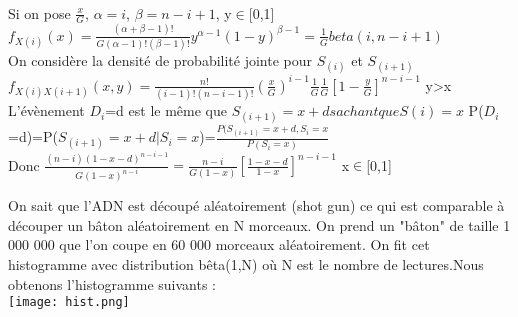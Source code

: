 \documentclass{book}
\begin{document}
\\Si on pose $ \frac{x}{G}$, $\alpha=i$, $\beta=n-i+1$, y$\in$[0,1]                                                                                                                                                                                                                                                                                                                                                                                                                                                                                                                                                                                                                                                    \\ 
$f_{X(i)}(x)= \frac{(\alpha+\beta-1)!}{G(\alpha-1)!(\beta-1)!}y^{\alpha-1}(1-y)^{\beta-1}=\frac{1}{G}beta(i,n-i+1) $\\
On considère la densité de probabilité jointe pour $S_(i)$ et $S_{(i+1)}$\\
$f_{X(i)X(i+1)}(x,y) = \frac{n!}{(i-1)!(n-i-1)!} (\frac{x}{G})^{i-1} \frac{1}{G} \frac{1}{G}[1-\frac{y}{G}]^{n-i-1}$ y>x\\
L'évènement $D_i$=d est le même que $S_{(i+1)}=x+d sachant que S(i)=x$
P($D_i$=d)=P($S_{(i+1)}=x+d|S_i=x $)=$\frac{P(S_{(i+1)}=x+d,S_i=x}{P(S_i=x)} $\\
Donc $\frac{(n-i)(1-x-d)^{n-i-1}}{G(1-x)^{n-i}}=\frac{n-i}{G(1-x)}[\frac{1-x-d}{1-x}]^{n-i-1}$ x$\in$[0,1]                                                                                                                                                                                                                                                                                                                                                                                                                                                                                                                                                                                                                                                   

On sait que l'ADN est découpé aléatoirement (shot gun) ce qui est comparable à découper un bâton aléatoirement en N morceaux. 
On prend un "bâton" de taille 1 000 000 que l'on coupe en 60 000 morceaux aléatoirement. 
On fit cet histogramme avec distribution bêta(1,N) où N est le nombre de lectures.Nous obtenons l'histogramme suivants : \\
\texttt{[image: hist.png]}
\end{document}
